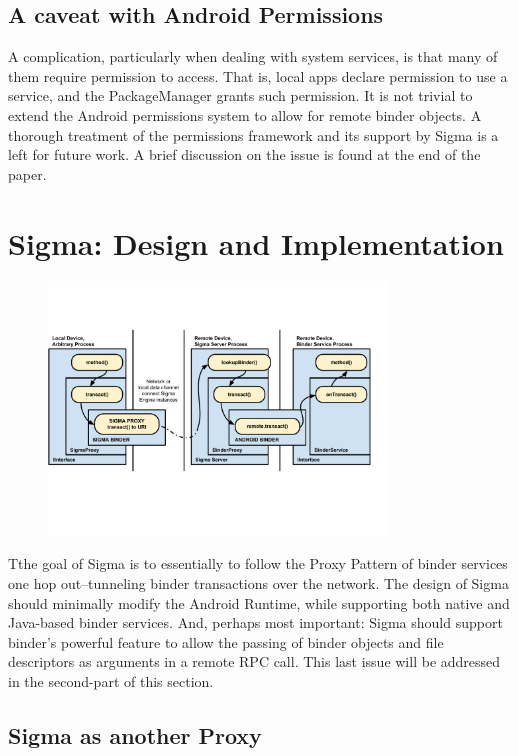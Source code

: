 \documentclass[prodmode]{acmlarge}
\begin{document}
\subsection{A caveat with Android Permissions}
A complication, particularly when dealing with system services, is that many of them require permission to access. That is, local apps declare permission to use a service, and the PackageManager grants such permission. It is not trivial to extend the Android permissions system to allow for remote binder objects. A thorough treatment of the permissions framework and its support by Sigma is a left for future work. A brief discussion on the issue is found at the end of the paper.

\section{Sigma: Design and Implementation}
\begin{figure}
\centering
\includegraphics[width=0.8\textwidth]{drawings/sigma_proxy_pattern.pdf}
\end{figure}
Tthe goal of Sigma is to essentially to follow the Proxy Pattern of binder services one hop out--tunneling binder transactions over the network. The design of Sigma should minimally modify the Android Runtime, while supporting both native and Java-based binder services. And, perhaps most important: Sigma should support binder's powerful feature to allow the passing of binder objects and file descriptors as arguments in a remote RPC call. This last issue will be addressed in the second-part of this section.

\subsection{Sigma as another Proxy}
\end{document}
